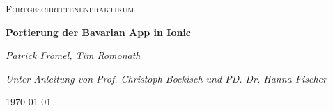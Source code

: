 \documentclass[a4paper]{report}
\begin{document}
	\begin{titlepage}
		\centering
		{\scshape\Large Fortgeschrittenenpraktikum\par}
		\vspace{1.5cm}
		{\huge\bfseries Portierung der Bavarian App in Ionic\par}
		\vspace{2cm}
		{\Large\itshape Patrick Frömel, Tim Romonath\par}
		\vspace{2cm}
		{\itshape Unter Anleitung von Prof. Christoph Bockisch und PD. Dr. Hanna Fischer \par}
		\vfill
		{\large \today\par}
	\end{titlepage}
   	
   	\tableofcontents
   	
    \newpage
		
	
	\newpage
		
		
	\newpage
			
		
	\newpage
	
	
	\newpage
	
	
	\newpage
	
\end{document}
